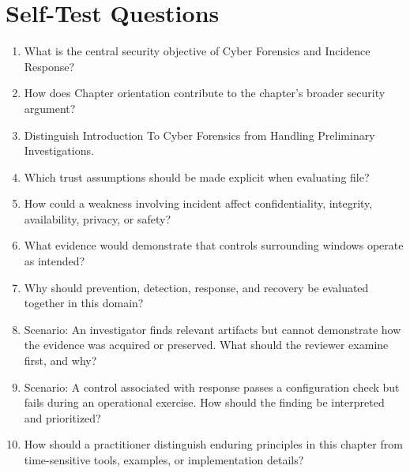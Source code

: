 \documentclass[11pt]{article}
\begin{document}
\section*{Self-Test Questions}
\begin{enumerate}
\item What is the central security objective of Cyber Forensics and Incidence Response?
\item How does Chapter orientation contribute to the chapter's broader security argument?
\item Distinguish Introduction To Cyber Forensics from Handling Preliminary Investigations.
\item Which trust assumptions should be made explicit when evaluating file?
\item How could a weakness involving incident affect confidentiality, integrity, availability, privacy, or safety?
\item What evidence would demonstrate that controls surrounding windows operate as intended?
\item Why should prevention, detection, response, and recovery be evaluated together in this domain?
\item Scenario: An investigator finds relevant artifacts but cannot demonstrate how the evidence was acquired or preserved. What should the reviewer examine first, and why?
\item Scenario: A control associated with response passes a configuration check but fails during an operational exercise. How should the finding be interpreted and prioritized?
\item How should a practitioner distinguish enduring principles in this chapter from time-sensitive tools, examples, or implementation details?
\end{enumerate}
\end{document}
